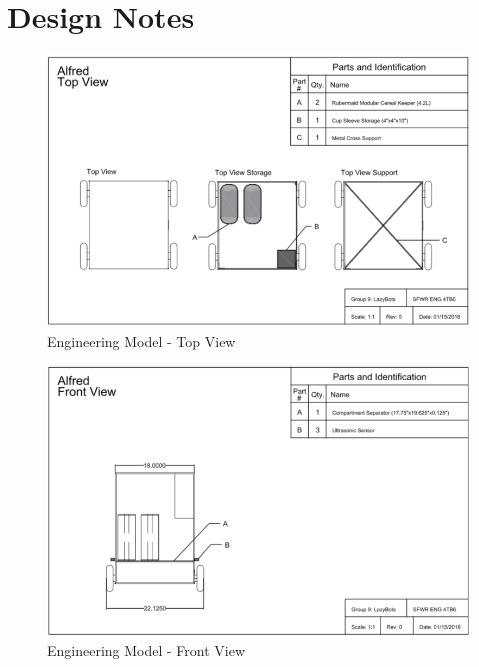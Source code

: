 \documentclass [10pt]{article}
\begin{document}
\newpage


\section {Design Notes}

\begin{figure}[H]
	\centering
	\includegraphics [scale = 0.55] {figures/CAD_Top_View.png}
	\caption{Engineering Model - Top View}
\end{figure}
	
\begin{figure}[H]
	\centering
	\includegraphics [scale = 0.55] {figures/CAD_Front_View.png}
	\caption{Engineering Model - Front View}
\end{figure}
	
\end{document}

